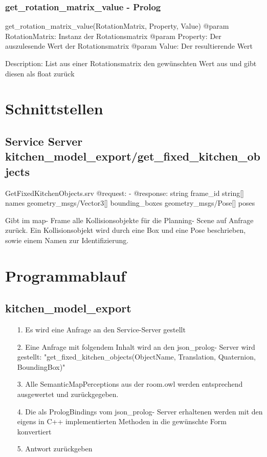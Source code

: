 \documentclass{suturo}
\begin{document}
\subsubsection{get\_rotation\_matrix\_value - Prolog}
\begin{spverbatim}
get_rotation_matrix_value(RotationMatrix, Property, Value)
@param RotationMatrix: Instanz der Rotationsmatrix
@param Property:       Der auszulesende Wert der Rotationsmatrix
@param Value:          Der resultierende Wert

Description: List aus einer Rotationsmatrix den gewünschten Wert aus und gibt diesen als float zurück
\end{spverbatim}


\section{Schnittstellen}

\subsection{Service Server kitchen\_model\_export/get\_fixed\_kitchen\_objects}
\begin{spverbatim}
GetFixedKitchenObjects.srv
@request: -
@response: string frame_id
           string[] names
           geometry_msgs/Vector3[] bounding_boxes
           geometry_msgs/Pose[] poses
\end{spverbatim}
Gibt im map- Frame alle Kollisionsobjekte für die Planning- Scene auf Anfrage zurück. Ein Kollisionsobjekt wird durch eine Box und eine Pose beschrieben, sowie einem Namen zur Identifizierung.

\section{Programmablauf}
\subsection{kitchen\_model\_export}
\begin{itemize}
\item[1.]Es wird eine Anfrage an den Service-Server gestellt
\item[2.]Eine Anfrage mit folgendem Inhalt wird an den json\_prolog- Server wird gestellt: "get\_fixed\_kitchen\_objects(ObjectName, Translation, Quaternion, BoundingBox)" 
\item[3.]Alle SemanticMapPerceptions aus der room.owl werden entsprechend ausgewertet und zurückgegeben.
\item[4.] Die als PrologBindings vom json\_prolog- Server erhaltenen werden mit den eigens in C++ implementierten Methoden in die gewünschte Form konvertiert
\item[5.] Antwort zurückgeben
\end{itemize}
\end{document}
